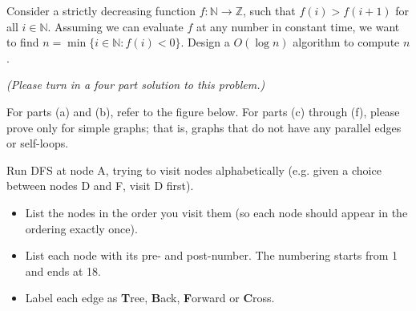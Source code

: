 \begin{qunlist}



Consider a strictly decreasing function $f :
\mathbb{N} \rightarrow \mathbb{Z}$, such that $f(i) > f(i + 1)$ for all $i \in \mathbb{N}$. Assuming we can evaluate $f$ at any number in constant time, we want to find $n = \min\{i \in \mathbb{N}:f(i) < 0\}$. Design a $O(\log n)$ algorithm to compute $n$.

\textit{(Please turn in a four part solution to this problem.)}



\pagebreak


For parts (a) and (b), refer to the figure below. For parts (c) through (f), please prove only for simple graphs; that is, graphs that do not have any parallel edges or self-loops.


\begin{qparts}
\item Run DFS at node A, trying to visit nodes alphabetically (e.g. given a choice between nodes D and F, visit D first).

\begin{itemize}
\item List the nodes in the order you visit them (so each node should appear in the ordering exactly once).
\item List each node with its pre- and post-number. The numbering starts from 1 and ends at 18.
\item Label each edge as \textbf{T}ree, \textbf{B}ack, \textbf{F}orward or \textbf{C}ross.
\end{itemize}



\end{qparts}
\end{qunlist}
